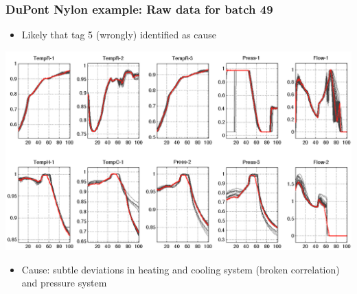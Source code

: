 \begin{frame}\frametitle{DuPont Nylon example: Raw data for batch 49}

	\begin{itemize}
		\item	Likely that tag 5 (wrongly) identified as cause
	\end{itemize}
	\begin{center}
		\includegraphics[width=\textwidth]{images/dupont/dupont-highlight-raw-data-batch-49.png}
	\end{center}
	
	\begin{itemize}
		\item	Cause: subtle deviations in heating and cooling system (broken correlation) and pressure system
	\end{itemize}
\end{frame}

